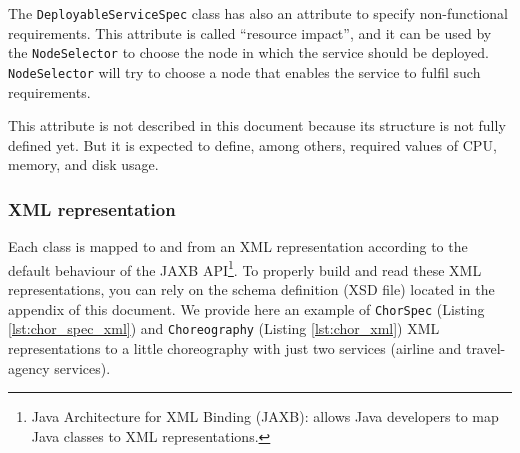 \documentclass[a4paper, 10pt]{article}
\begin{document}
The \verb!DeployableServiceSpec! class has also an attribute to specify non-functional requirements. This attribute is called ``resource impact'', and it can be used by the \verb!NodeSelector! to choose the node in which the service should be deployed. \verb!NodeSelector! will try to choose a node that enables the service to fulfil such requirements.

This attribute is not described in this document because its structure is not fully defined yet. But it is expected to define, among others, required values of CPU, memory, and disk usage.

\subsubsection*{XML representation}

Each class is mapped to and from an XML representation according to the default behaviour of the JAXB API\footnote{Java Architecture for XML Binding (JAXB): allows Java developers to map Java classes to XML representations.}. 
To properly build and read these XML representations, you can rely on the schema definition (XSD file) located in the appendix of this document. We provide here an example of \verb!ChorSpec! (Listing \ref{lst:chor_spec_xml}) and \verb!Choreography! (Listing \ref{lst:chor_xml}) XML representations to a little choreography with just two services (airline and travel-agency services). 
\end{document}
